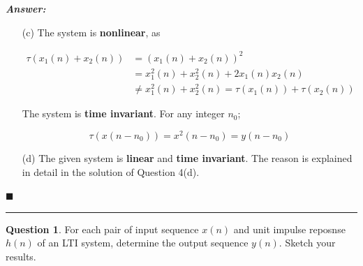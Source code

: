 \documentclass[12pt]{article}
\theoremstyle{definition}
\newtheorem{question}{Question}
\newenvironment{answer}{
    \textbf{\textit{Answer:}} \qquad
}{\hfill $\blacksquare$ \\ \begin{center}
    \rule{0.6\linewidth}{0.5px}    
\end{center}
}
\begin{document}
\begin{answer}
\begin{enumerate}
        \item[(c)] The system is \textbf{nonlinear}, as
        
        \begin{align*}
            \tau(x_1(n) + x_2(n)) & = (x_1(n) + x_2(n))^2\\
            & = x_1^2(n) + x_2^2(n) + 2x_1(n)x_2(n) \\
            & \neq x_1^2(n) + x_2^2(n) = \tau(x_1(n)) + \tau(x_2(n))            
        \end{align*}

        The system is \textbf{time invariant}. For any integer $n_0$;

        $$
        \tau(x(n - n_0)) = x^2(n - n_0) = y(n - n_0)
        $$

        \item[(d)] The given system is \textbf{linear} and \textbf{time invariant}. The reason is explained in detail in the solution of Question 4(d).



    \end{enumerate}
\end{answer}



\begin{question}
    For each pair of input sequence $x(n)$ and unit impulse reposnse $h(n)$ of an LTI system, determine the output sequence $y(n)$. Sketch your results.
\end{question}
\end{document}

